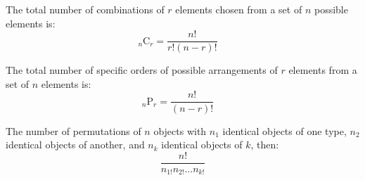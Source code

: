 \documentclass[11pt]{article}
\newcommand{\comb}[2]{{}_{#1}\mathrm{C}_{#2}}
\newcommand{\perm}[2]{{}_{#1}\mathrm{P}_{#2}}
\begin{document}
\begin{definition}\label{def:combinations-formula}
    The total number of combinations of $r$ elements chosen from a set of $n$ possible elements is:
    \begin{equation*}
        \comb{n}{r} = \frac{n!}{r!(n-r)!}\quad
    \end{equation*}
\end{definition}

\begin{definition}\label{def:permutations-formula}
    The total number of specific orders of possible arrangements of $r$
    elements from a set of $n$ elements is:
    \begin{equation*}
        \perm{n}{r} = \frac{n!}{(n-r)!}\quad
    \end{equation*}

    The number of permutations of $n$ objects with $n_1$ identical objects
    of one type, $n_2$ identical objects of another, and $n_k$ identical objects
    of $k$, then:
    \begin{equation*}
        \frac{n!}{n_{1!}n_{2!} ... n_{k!}}
    \end{equation*}
\end{definition}
\end{document}
